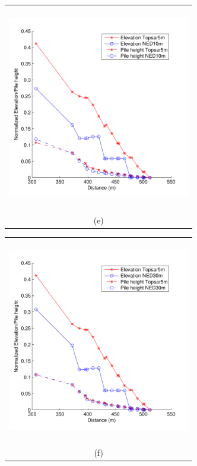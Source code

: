 \documentclass[12pt,letterpaper]{article}
\begin{document}
\begin{figure}[H]
\ContinuedFloat 
  \begin{minipage}[b]{0.5\textwidth}
    \begin{tabular}{c}
      \includegraphics[width=8cm,height=9cm,keepaspectratio]{plots/high_T5_N10.pdf}\\
      (e)
    \end{tabular}
  \end{minipage}
  \begin{minipage}{0.5\textwidth}
    \begin{tabular}{c}
      \includegraphics[width=8cm,height=9cm,keepaspectratio]{plots/high_T5_N30.pdf}\\
      (f)
    \end{tabular}
  \end{minipage}
  \begin{minipage}[b]{0.5\textwidth}

\end{minipage}
\end{figure}
\end{document}
